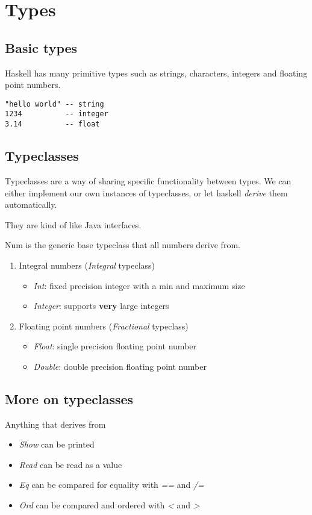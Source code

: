 \section{Types}
\subsection{Basic types}
Haskell has many primitive types such as strings, characters, integers and floating point numbers.

\begin{lstlisting}
"hello world" -- string
1234          -- integer
3.14          -- float
\end{lstlisting}

\subsection{Typeclasses}
Typeclasses are a way of sharing specific functionality between types. We can either implement our
own instances of typeclasses, or let haskell \emph{derive} them automatically.

They are kind of like Java interfaces.

Num is the generic base typeclass that all numbers derive from.
\begin{enumerate}
    \item Integral numbers (\emph{Integral} typeclass)
    \begin{itemize}
        \item \emph{Int}: fixed precision integer with a min and maximum size
        \item \emph{Integer}: supports \textbf{very} large integers
    \end{itemize}
    \item Floating point numbers (\emph{Fractional} typeclass)
    \begin {itemize}
        \item \emph{Float}: single precision floating point number
        \item \emph{Double}: double precision floating point number
    \end{itemize}
\end{enumerate}

\subsection{More on typeclasses}
Anything that derives from
\begin{itemize}
    \item \emph{Show} can be printed
    \item \emph{Read} can be read as a value
    \item \emph{Eq} can be compared for equality with \emph{==} and \emph{/=}
    \item \emph{Ord} can be compared and ordered with \emph{<} and \emph{>}
\end{itemize}

